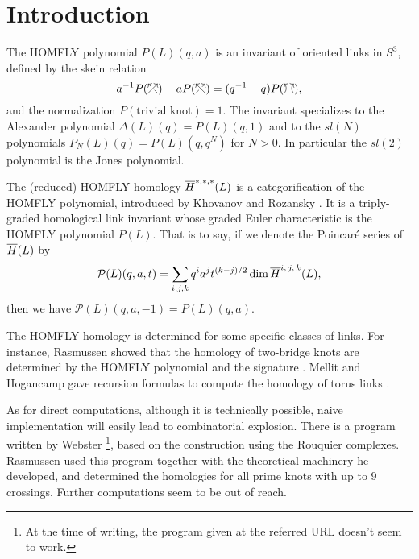 \section{Introduction} \label{sec:intro}

The HOMFLY polynomial \cite{HOMFLY, Jones, PT} $P(L)(q, a)$ is an invariant of oriented links in $S^3$, defined by the skein relation
\[
    a^{-1}P(
    \begin{tikzpicture}[baseline=1]
        \draw[->] (0,0)--(0.3,0.3);
        \draw (0.3,0)--(0.2,0.1);
        \draw[->] (0.1,0.2)--(0,0.3);
    \end{tikzpicture}
    )-a P(
    \begin{tikzpicture}[baseline=1]
        \draw[->] (0.3,0)--(0,0.3);
        \draw (0,0)--(0.1,0.1);
        \draw[->] (0.2,0.2)--(0.3,0.3);
    \end{tikzpicture}
    )=(q^{-1}-q)P(
    \begin{tikzpicture}[baseline=1]
        \draw [bend right = 45,->] (0,0) to (0,0.3);
        \draw [bend left = 45,->] (0.3,0) to (0.3,0.3);
    \end{tikzpicture}
    ),
\]
and the normalization $P(\text{trivial knot}) = 1$.
The invariant specializes to the Alexander polynomial $\Delta(L)(q) = P(L)(q, 1)$ and to the $sl(N)$ polynomials $P_N(L)(q) = P(L)(q, q^N)$ for $N > 0$. In particular the $sl(2)$ polynomial is the Jones polynomial.

The (reduced) HOMFLY homology $\overline{H}^{*,*,*}(L)$ is a categorification of the HOMFLY polynomial, introduced by Khovanov and Rozansky \cite{KR08}.
It is a triply-graded homological link invariant whose graded Euler characteristic is the HOMFLY polynomial $P(L)$.
That is to say, if we denote the Poincar\'e series of $\overline{H}(L)$ by
\[
\mathcal{P}(L)(q, a, t) = \sum_{i,j,k} q^ia^jt^{(k-j)/2}\dim \overline{H}^{i,\,j,\,k}(L),
\]
then we have $\mathcal{P}(L)(q, a, -1) = P(L)(q,a)$.

The HOMFLY homology is determined for some specific classes of links. For instance, Rasmussen showed that the homology of two-bridge knots are determined by the HOMFLY polynomial and the signature \cite{Ras07}. Mellit and Hogancamp gave recursion formulas to compute the homology of torus links \cite{HM19}.

As for direct computations, although it is technically possible, naive implementation will easily lead to combinatorial explosion. There is a program written by Webster \cite{Web}\footnote{At the time of writing, the program given at the referred URL doesn't seem to work.}, based on the construction using the Rouquier complexes.
Rasmussen \cite{Ras15} used this program together with the theoretical machinery he developed, and determined the homologies for all prime knots with up to $9$ crossings. Further computations seem to be out of reach.

